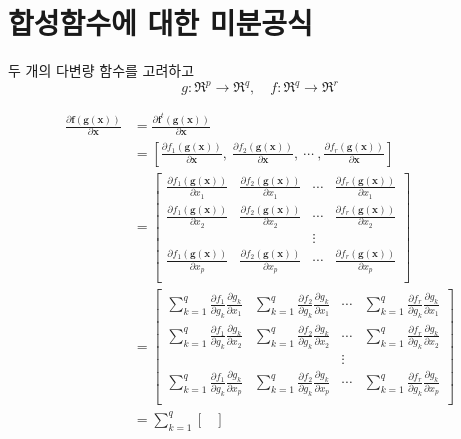 \documentclass[
]{book}
\newcommand{\pardiff}[2]{\frac{\partial #1}{\partial #2 }}
\theoremstyle{definition}
\theoremstyle{definition}
\theoremstyle{definition}
\theoremstyle{remark}
\begin{document}
\hypertarget{uxd569uxc131uxd568uxc218uxc5d0-uxb300uxd55c-uxbbf8uxbd84uxacf5uxc2dd}{%
\section{합성함수에 대한 미분공식}\label{uxd569uxc131uxd568uxc218uxc5d0-uxb300uxd55c-uxbbf8uxbd84uxacf5uxc2dd}}

두 개의 다변량 함수를 고려하고
\[ g: \Re^p \rightarrow \Re^q, \quad f:\Re^q \rightarrow \Re^r \]

\begin{align*}
\pardiff{ \bm f(\bm g(\bm x)) }{\bm x} & =
\pardiff{ \bm f^t(\bm g(\bm x)) }{\bm x} \\
& = \left [ \pardiff{  f_1(\bm g(\bm x)) }{\bm x},~
\pardiff{  f_2(\bm g(\bm x)) }{\bm x},~ \cdots ~,
\pardiff{  f_r(\bm g(\bm x)) }{\bm x} \right ] \\
& =
\begin{bmatrix}
\pardiff{  f_1(\bm g(\bm x)) }{x_1} & \pardiff{  f_2(\bm g(\bm x)) }{x_1} & \cdots &
\pardiff{  f_r(\bm g(\bm x)) }{x_1} \\
\pardiff{  f_1(\bm g(\bm x)) }{x_2} & \pardiff{  f_2(\bm g(\bm x)) }{x_2} & \cdots &
\pardiff{  f_r(\bm g(\bm x)) }{x_2} \\
 & & \vdots & \\
\pardiff{  f_1(\bm g(\bm x)) }{x_p} & \pardiff{  f_2(\bm g(\bm x)) }{x_p} & \cdots &
\pardiff{  f_r(\bm g(\bm x)) }{x_p} \\
\end{bmatrix} \\
& =\begin{bmatrix}
\sum_{k=1}^q \pardiff{  f_1 }{ g_k} \pardiff{  g_k }{ x_1} & 
  \sum_{k=1}^q \pardiff{  f_2 }{ g_k} \pardiff{  g_k }{x_1} & \cdots &
  \sum_{k=1}^q \pardiff{  f_r }{ g_k} \pardiff{  g_k }{x_1}  \\
\sum_{k=1}^q \pardiff{  f_1 }{ g_k} \pardiff{  g_k }{ x_2} & 
  \sum_{k=1}^q \pardiff{  f_2 }{ g_k} \pardiff{  g_k }{x_2} & \cdots &
  \sum_{k=1}^q \pardiff{  f_r }{ g_k} \pardiff{  g_k }{x_2}  \\
 & & \vdots & \\
\sum_{k=1}^q \pardiff{  f_1 }{ g_k} \pardiff{  g_k }{ x_p} & 
  \sum_{k=1}^q \pardiff{  f_2 }{ g_k} \pardiff{  g_k }{x_p} & \cdots &
  \sum_{k=1}^q \pardiff{  f_r }{ g_k} \pardiff{  g_k }{x_p}  \\
\end{bmatrix} \\
& = \sum_{k=1}^q \begin{bmatrix}

\end{bmatrix}
\end{align*}
\end{document}
